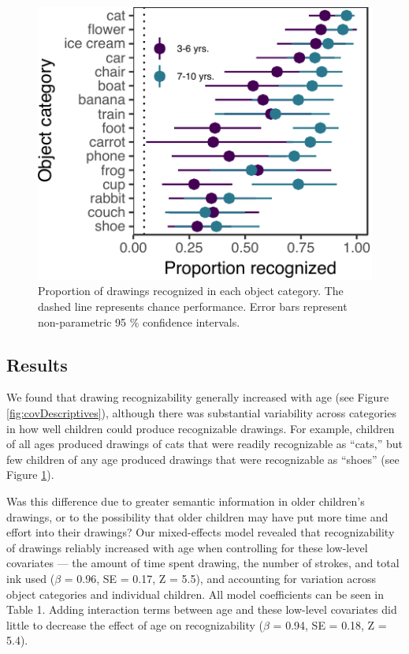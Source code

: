 \documentclass[10pt, letterpaper]{article}
\newenvironment{CodeChunk}{}{}
\begin{document}
\begin{CodeChunk}
\begin{figure}[t]

{\centering \includegraphics{figs/recognizabilityByItem-1} 

}

\caption[Proportion of drawings recognized in each object category]{Proportion of drawings recognized in each object category. The dashed line represents chance performance. Error bars represent non-parametric 95 \% confidence intervals. }\label{fig:recognizabilityByItem}
\end{figure}
\end{CodeChunk}

\subsection{Results}\label{results}

We found that drawing recognizability generally increased with age (see
Figure \ref{fig:covDescriptives}), although there was substantial
variability across categories in how well children could produce
recognizable drawings. For example, children of all ages produced
drawings of cats that were readily recognizable as ``cats,'' but few
children of any age produced drawings that were recognizable as
``shoes'' (see Figure \ref{fig:recognizabilityByItem}).

Was this difference due to greater semantic information in older
children's drawings, or to the possibility that older children may have
put more time and effort into their drawings? Our mixed-effects model
revealed that recognizability of drawings reliably increased with age
when controlling for these low-level covariates --- the amount of time
spent drawing, the number of strokes, and total ink used (\(\beta\) =
0.96, SE = 0.17, Z = 5.5), and accounting for variation across object
categories and individual children. All model coefficients can be seen
in Table 1. Adding interaction terms between age and these low-level
covariates did little to decrease the effect of age on recognizability
(\(\beta\) = 0.94, SE = 0.18, Z = 5.4).
\end{document}

